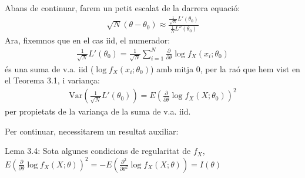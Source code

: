 \documentclass[letterpaper,10pt,english]{sphinxmanual}
\begin{document}
Abans de continuar, farem un petit escalat de la darrera equació:
\begin{equation*}
\begin{split}\sqrt{N}(\theta - \theta_0) \approx \frac{\frac{1}{\sqrt{N}} L'(\theta_0)}{ \frac{1}{N} L''(\theta_0)}\end{split}
\end{equation*}
Ara, fixem\sphinxhyphen{}nos que en el cas iid, el numerador:
\begin{equation*}
\begin{split}\frac{1}{\sqrt{N}} L'(\theta_0) =\frac{1}{\sqrt{N}} \sum_{i=1}^{N} \frac{\partial}{\partial \theta} \log f_X(x_i;\theta_0)\end{split}
\end{equation*}
és una suma de v.a. iid (\(\log f_X(x_i;\theta_0)\)) amb mitja 0, per la raó que hem vist
en el Teorema 3.1, i variança:
\begin{equation*}
\begin{split}\mbox{Var}(\frac{1}{\sqrt{N}} L'(\theta_0)) =E( \frac{\partial}{\partial \theta} \log f_X(X;\theta_0))^2\end{split}
\end{equation*}
per propietats de la variança de la suma de v.a. iid.

Per continuar, necessitarem un resultat auxiliar:

Lema 3.4: Sota algunes condicions de regularitat de
\(f_X\), \(E( \frac{\partial}{\partial \theta} \log f_X(X;\theta))^2 = - E( \frac{\partial^2}{\partial \theta^2} \log f_X(X;\theta)) = I(\theta)\)
\end{document}

